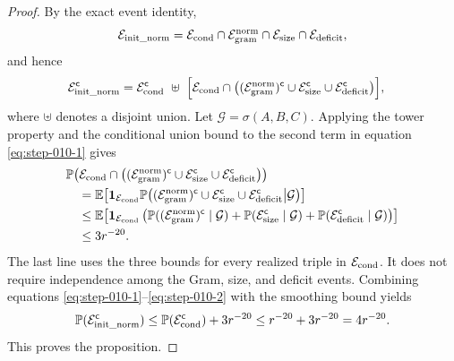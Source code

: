 \begin{proof}
By the exact event identity,
\[
  \mathcal E_{\rm init\_norm}
  =\mathcal E_{\rm cond}\cap\mathcal E_{\rm gram}^{\rm norm}
   \cap\mathcal E_{\rm size}\cap\mathcal E_{\rm deficit},
\]
and hence
\begin{equation}
\begin{aligned}
  \mathcal E_{\rm init\_norm}^{\mathsf c}
  ={}&\mathcal E_{\rm cond}^{\mathsf c}\ \uplus\
  \Bigl[\mathcal E_{\rm cond}\cap
    \bigl((\mathcal E_{\rm gram}^{\rm norm})^{\mathsf c}
      \cup\mathcal E_{\rm size}^{\mathsf c}
      \cup\mathcal E_{\rm deficit}^{\mathsf c}\bigr)\Bigr],
\end{aligned}                                               \label{eq:step-010-1}
\end{equation}
where \(\uplus\) denotes a disjoint union. Let
\(\mathcal G=\sigma(A,B,C)\). Applying the tower property and the
conditional union bound to the second term in equation \eqref{eq:step-010-1} gives
\begin{equation}
\begin{aligned}
&\mathbb P\!\left(\mathcal E_{\rm cond}\cap
    \bigl((\mathcal E_{\rm gram}^{\rm norm})^{\mathsf c}
      \cup\mathcal E_{\rm size}^{\mathsf c}
      \cup\mathcal E_{\rm deficit}^{\mathsf c}\bigr)\right)\\
&\quad=\mathbb E\!\left[\mathbf 1_{\mathcal E_{\rm cond}}
  \mathbb P\!\left(
    (\mathcal E_{\rm gram}^{\rm norm})^{\mathsf c}
      \cup\mathcal E_{\rm size}^{\mathsf c}
      \cup\mathcal E_{\rm deficit}^{\mathsf c}
      \middle|\mathcal G\right)\right]\\
&\quad\le\mathbb E\!\left[\mathbf 1_{\mathcal E_{\rm cond}}
  \left(
    \mathbb P((\mathcal E_{\rm gram}^{\rm norm})^{\mathsf c}
      \mid\mathcal G)
    +\mathbb P(\mathcal E_{\rm size}^{\mathsf c}\mid\mathcal G)
    +\mathbb P(\mathcal E_{\rm deficit}^{\mathsf c}\mid\mathcal G)
  \right)\right]\\
&\quad\le 3r^{-20}.
\end{aligned}\label{eq:step-010-2}
\end{equation}
The last line uses the three bounds for every realized triple in
\(\mathcal E_{\rm cond}\). It does not require independence among the
Gram, size, and deficit events. Combining equations \eqref{eq:step-010-1}--\eqref{eq:step-010-2} with the
smoothing bound yields
\[
  \mathbb P(\mathcal E_{\rm init\_norm}^{\mathsf c})
  \le \mathbb P(\mathcal E_{\rm cond}^{\mathsf c})+3r^{-20}
  \le r^{-20}+3r^{-20}=4r^{-20}.
\]
This proves the proposition. 

\end{proof}


